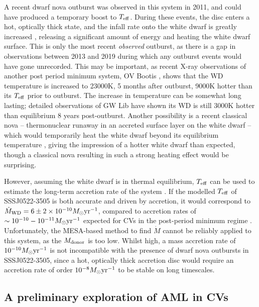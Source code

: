 A recent dwarf nova outburst was observed in this system in 2011, and could have produced a temporary boost to $T_{\rm eff}$. During these events, the disc enters a hot, optically thick state, and the infall rate onto the white dwarf is greatly increased \citep{osaki1996}, releasing a significant amount of energy and heating the white dwarf surface.
This is only the most recent \textit{observed} outburst, as there is a gap in observations between 2013 and 2019 during which any outburst events would have gone unrecorded. This may be important, as recent X-ray observations of another post period minimum system, OV Bootis \citep{Schwope2021}, shows that the WD temperature is increased to 23000K, 5 months after outburst, 9000K hotter than its $T_{\rm eff}$ prior to outburst. The increase in temperature can be somewhat long lasting; detailed observations of GW Lib have shown its WD is still 3000K hotter than equilibrium 8 years post-outburst\citep{Szkody2016}.
Another possibility is a recent classical nova -- thermonuclear runaway in an accreted surface layer on the white dwarf -- which would temporarily heat the white dwarf beyond its equilibrium temperature \citep{starrfield2016}, giving the impression of a hotter white dwarf than expected, though a classical nova resulting in such a strong heating effect would be surprising.

However, assuming the white dwarf is in thermal equilibrium, $T_{\rm eff}$ can be used to estimate the long-term accretion rate of the system \citep{townsley2009}.
If the modelled $T_{\rm eff}$ of SSSJ0522-3505 is both accurate and driven by accretion, it would correspond to $\dot M_{\rm WD} = 6\pm2 \times 10^{-10} M_\odot {\rm yr^{-1}}$, compared to accretion rates of $\sim10^{-10}-10^{-11} M_\odot {\rm yr^{-1}}$ expected for CVs in the post-period minimum regime \citep{Pala2017a}. Unfortunately, the MESA-based method to find $\dot M$ cannot be reliably applied to this system, as the $M_{\rm donor}$ is too low.
Whilst high, a mass accretion rate of $10^{-10} M_\odot {\rm yr^{-1}}$ is not incompatible with the presence of dwarf nova outbursts in SSSJ0522-3505, since a hot, optically thick accretion disc would require an accretion rate of order $10^{-8} M_\odot {\rm yr^{-1}}$ \citep{Hameury1998} to be stable on long timescales.



\subsection{A preliminary exploration of AML in CVs}
\label{sect:discussion AML}


